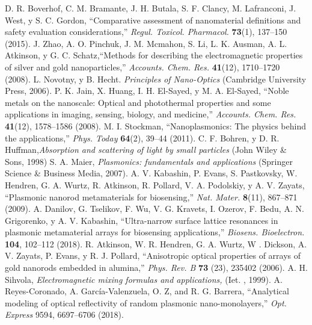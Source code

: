 \documentclass[letterpaper,11pt] {article}
\begin{document}
 \begin{thebibliography}{     }
  D.  R.  Boverhof, C.  M.  Bramante, J. H.  Butala, S. F.  Clancy, M.  Lafranconi, J.  West, y S. C.  Gordon, ``Comparative assessment of nanomaterial definitions and safety evaluation considerations,'' \emph{Regul.  Toxicol.  Pharmacol. } \textbf{73}(1), 137--150 (2015). 
 J.  Zhao, A. O.  Pinchuk, J. M.  Mcmahon, S.  Li, L. K.  Ausman, A. L.  Atkinson, y G. C.  Schatz,``Methods for describing the electromagnetic properties of silver and gold nanoparticles,'' \emph{Accounts.  Chem.  Res. } \textbf{41}(12), 1710--1720 (2008). 
%
 L.  Novotny, y B.  Hecht.  \emph{Principles of Nano-Optics} (Cambridge University Press, 2006). 
%
 P.  K.  Jain, X.  Huang, I.  H.  El-Sayed, y M.  A.  El-Sayed, ``Noble metals on the nanoscale: Optical and photothermal properties and some applications in imaging, sensing, biology, and medicine,'' \emph{Accounts.  Chem.  Res. } \textbf{41}(12), 1578--1586 (2008). 
%
 M. I.  Stockman, ``Nanoplasmonics: The physics behind the applications,'' \emph{Phys.  Today} \textbf{64}(2), 39--44 (2011).  
%
 C.  F.  Bohren, y D. R.  Huffman,\emph{Absorption and scattering of light by small particles} (John Wiley \& Sons, 1998)
%
 S.  A.  Maier, \emph{Plasmonics: fundamentals and applications} (Springer Science \& Business Media, 2007). 
%
 A.  V.  Kabashin, P.  Evans, S.  Pastkovsky, W.  Hendren, G.  A.  Wurtz, R.  Atkinson, R.  Pollard, V.  A.  Podolskiy, y A.  V.  Zayats, ``Plasmonic nanorod metamaterials for biosensing,'' \emph{Nat.  Mater. } \textbf{8}(11), 867--871 (2009). 
%
 A.  Danilov, G.  Tselikov, F.  Wu, V.  G.  Kravets, I.  Ozerov, F.  Bedu, A.  N.  Grigorenko, y A.  V.  Kabashin, ``Ultra-narrow surface lattice resonances in plasmonic metamaterial arrays for biosensing applications,'' \emph{Biosens.  Bioelectron. } \textbf{104}, 102--112 (2018). 
%
 R.  Atkinson, W.  R.  Hendren, G.  A.  Wurtz, W . Dickson, A. V.  Zayats, P.  Evans, y R.  J.  Pollard, ``Anisotropic optical properties of arrays of gold nanorods embedded in alumina,'' \emph{Phys.  Rev.  B} \textbf{73} (23), 235402 (2006). 
%
 A.  H.  Sihvola, \emph{Electromagnetic mixing formulas and applications,} (Iet. , 1999). 
%
 A.  Reyes-Coronado,  A.  García-Valenzuela, O.  Z, and R.  G.  Barrera, ``Analytical modeling of optical reflectivity of random plasmonic nano-monolayers,'' \emph{Opt.  Express} 9594, 6697–6706 (2018). 

\end{thebibliography}
\end{document}
